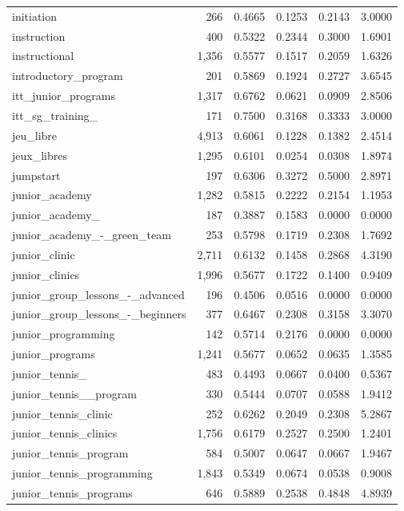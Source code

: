\begin{table}[htbp]
\begin{tabular}{lrrrrr}
  initiation & 266 & 0.4665 & 0.1253 & 0.2143 & 3.0000 \\
  instruction & 400 & 0.5322 & 0.2344 & 0.3000 & 1.6901 \\
  instructional & 1,356 & 0.5577 & 0.1517 & 0.2059 & 1.6326 \\
  introductory\_program & 201 & 0.5869 & 0.1924 & 0.2727 & 3.6545 \\
  itt\_junior\_programs & 1,317 & 0.6762 & 0.0621 & 0.0909 & 2.8506 \\
  itt\_sg\_training\_ & 171 & 0.7500 & 0.3168 & 0.3333 & 3.0000 \\
  jeu\_libre & 4,913 & 0.6061 & 0.1228 & 0.1382 & 2.4514 \\
  jeux\_libres & 1,295 & 0.6101 & 0.0254 & 0.0308 & 1.8974 \\
  jumpstart & 197 & 0.6306 & 0.3272 & 0.5000 & 2.8971 \\
  junior\_academy & 1,282 & 0.5815 & 0.2222 & 0.2154 & 1.1953 \\
  junior\_academy\_ & 187 & 0.3887 & 0.1583 & 0.0000 & 0.0000 \\
  junior\_academy\_-\_green\_team & 253 & 0.5798 & 0.1719 & 0.2308 & 1.7692 \\
  junior\_clinic & 2,711 & 0.6132 & 0.1458 & 0.2868 & 4.3190 \\
  junior\_clinics & 1,996 & 0.5677 & 0.1722 & 0.1400 & 0.9409 \\
  junior\_group\_lessons\_-\_advanced & 196 & 0.4506 & 0.0516 & 0.0000 & 0.0000 \\
  junior\_group\_lessons\_-\_beginners & 377 & 0.6467 & 0.2308 & 0.3158 & 3.3070 \\
  junior\_programming & 142 & 0.5714 & 0.2176 & 0.0000 & 0.0000 \\
  junior\_programs & 1,241 & 0.5677 & 0.0652 & 0.0635 & 1.3585 \\
  junior\_tennis\_ & 483 & 0.4493 & 0.0667 & 0.0400 & 0.5367 \\
  junior\_tennis\_\_program & 330 & 0.5444 & 0.0707 & 0.0588 & 1.9412 \\
  junior\_tennis\_clinic & 252 & 0.6262 & 0.2049 & 0.2308 & 5.2867 \\
  junior\_tennis\_clinics & 1,756 & 0.6179 & 0.2527 & 0.2500 & 1.2401 \\
  junior\_tennis\_program & 584 & 0.5007 & 0.0647 & 0.0667 & 1.9467 \\
  junior\_tennis\_programming & 1,843 & 0.5349 & 0.0674 & 0.0538 & 0.9008 \\
  junior\_tennis\_programs & 646 & 0.5889 & 0.2538 & 0.4848 & 4.8939 \\

\end{tabular}
\end{table}
